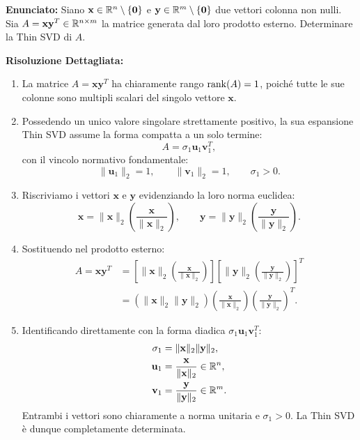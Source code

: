 \begin{example}[Thin SVD di una Matrice a Rango Unitario $A = \mathbf{x} \mathbf{y}^T$]
\textbf{Enunciato:} Siano $\mathbf{x} \in \mathbb{R}^n \setminus \{\mathbf{0}\}$ e $\mathbf{y} \in \mathbb{R}^m \setminus \{\mathbf{0}\}$ due vettori colonna non nulli. Sia $A = \mathbf{x} \mathbf{y}^T \in \mathbb{R}^{n \times m}$ la matrice generata dal loro prodotto esterno. Determinare la Thin SVD di $A$.

\medskip
\textbf{Risoluzione Dettagliata:}
\begin{enumerate}
    \item La matrice $A = \mathbf{x} \mathbf{y}^T$ ha chiaramente rango $\operatorname{rank}(A) = 1$, poich\'e tutte le sue colonne sono multipli scalari del singolo vettore $\mathbf{x}$.
    \item Possedendo un unico valore singolare strettamente positivo, la sua espansione Thin SVD assume la forma compatta a un solo termine:
    \begin{equation}
        A = \sigma_1 \mathbf{u}_1 \mathbf{v}_1^T,
    \end{equation}
    con il vincolo normativo fondamentale:
    \begin{equation}
        \|\mathbf{u}_1\|_2 = 1, \qquad \|\mathbf{v}_1\|_2 = 1, \qquad \sigma_1 > 0.
    \end{equation}
    \item Riscriviamo i vettori $\mathbf{x}$ e $\mathbf{y}$ evidenziando la loro norma euclidea:
    \begin{equation}
        \mathbf{x} = \|\mathbf{x}\|_2 \left( \frac{\mathbf{x}}{\|\mathbf{x}\|_2} \right), \qquad \mathbf{y} = \|\mathbf{y}\|_2 \left( \frac{\mathbf{y}}{\|\mathbf{y}\|_2} \right).
    \end{equation}
    \item Sostituendo nel prodotto esterno:
    \begin{align}
        A = \mathbf{x} \mathbf{y}^T &= \left[ \|\mathbf{x}\|_2 \left( \frac{\mathbf{x}}{\|\mathbf{x}\|_2} \right) \right] \left[ \|\mathbf{y}\|_2 \left( \frac{\mathbf{y}}{\|\mathbf{y}\|_2} \right) \right]^T \nonumber \\
        &= \left( \|\mathbf{x}\|_2 \|\mathbf{y}\|_2 \right) \left( \frac{\mathbf{x}}{\|\mathbf{x}\|_2} \right) \left( \frac{\mathbf{y}}{\|\mathbf{y}\|_2} \right)^T.
    \end{align}
    \item Identificando direttamente con la forma diadica $\sigma_1 \mathbf{u}_1 \mathbf{v}_1^T$:
    \begin{align}
        \sigma_1 &= \|\mathbf{x}\|_2 \|\mathbf{y}\|_2, \\
        \mathbf{u}_1 &= \frac{\mathbf{x}}{\|\mathbf{x}\|_2} \in \mathbb{R}^n, \\
        \mathbf{v}_1 &= \frac{\mathbf{y}}{\|\mathbf{y}\|_2} \in \mathbb{R}^m.
    \end{align}
    Entrambi i vettori sono chiaramente a norma unitaria e $\sigma_1 > 0$. La Thin SVD \`e dunque completamente determinata.
\end{enumerate}
\end{example}

